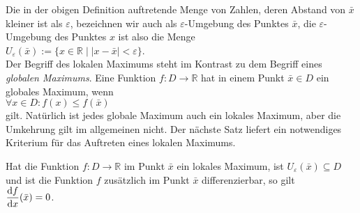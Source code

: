 Die in der obigen Definition auftretende Menge von Zahlen, deren Abstand von $\bar{x}$
kleiner ist als $\varepsilon$, bezeichnen wir auch als $\varepsilon$-Umgebung des Punktes
$\bar{x}$, die $\varepsilon$-Umgebung des Punktes $x$ ist also die Menge 
\\[0.2cm]
\hspace*{1.3cm} $U_\varepsilon(\bar{x}) := \bigl\{ x \in \mathbb{R} \;\big|\; |x - \bar{x}| < \varepsilon \bigr\}$.
\\[0.2cm]
Der Begriff des lokalen Maximums steht im Kontrast zu dem Begriff eines \emph{globalen Maximums}.
Eine Funktion $f:D \rightarrow \mathbb{R}$ hat in einem Punkt $\bar{x} \in D$ ein globales
Maximum, wenn
\\[0.2cm]
\hspace*{1.3cm}
$\forall x \in D: f(x) \leq f(\bar{x})$
\\[0.2cm]
gilt.  Nat\"urlich ist jedes globale Maximum auch ein lokales Maximum, aber die Umkehrung
gilt im allgemeinen nicht.  Der n\"achste Satz liefert ein notwendiges Kriterium f\"ur das
Auftreten eines lokalen Maximums.

\begin{Satz} \lb
Hat die Funktion $f: D \rightarrow \mathbb{R}$ im Punkt $\bar{x}$ ein lokales
Maximum, ist $U_\varepsilon(\bar{x}) \subseteq D$ und ist die Funktion $f$ zus\"atzlich im Punkt $\bar{x}$ differenzierbar, so gilt 
\\[0.3cm]
\hspace*{1.3cm}
$\displaystyle\frac{\textrm{d}f}{\textrm{d}x}(\bar{x}) = 0$.
\end{Satz}

